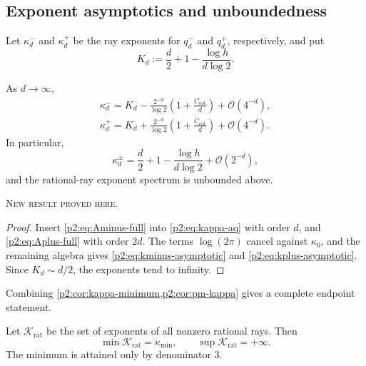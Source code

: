 \documentclass[11pt,oneside]{article}
\theoremstyle{definition}
\theoremstyle{remark}
\newcommand{\bigO}{\mathcal O}
\newcommand{\newresult}{\textcolor{newgreen}{\textsc{New result proved here.}}}
\begin{document}
\subsection{Exponent asymptotics and unboundedness}

Let $\kappa_d^-$ and $\kappa_d^+$ be the ray exponents for $q_d^-$ and $q_d^+$,
respectively, and put
\begin{equation}
 K_d:=\frac d2+1-\frac{\log h}{d\log2}.
 \label{p2:eq:Kd}
\end{equation}

\begin{corollary}\label{p2:cor:pm-kappa}
As $d\to\infty$,
\begin{align}
 \boxed{
 \kappa_d^-=K_d-\frac{2^{-d}}{\log2}
 \left(1+\frac{C_{\cot}}d\right)+\bigO(4^{-d}),}
 \label{p2:eq:kminus-asymptotic}\\
 \boxed{
 \kappa_d^+=K_d+\frac{2^{-d}}{\log2}
 \left(1+\frac{C_{\cot}}d\right)+\bigO(4^{-d}).}
 \label{p2:eq:kplus-asymptotic}
\end{align}
In particular,
\begin{equation}
 \kappa_d^{\pm}=\frac d2+1-\frac{\log h}{d\log2}+\bigO(2^{-d}),
 \label{p2:eq:kpm-main}
\end{equation}
and the rational-ray exponent spectrum is unbounded above.

\smallskip\noindent\newresult
\end{corollary}

\begin{proof}
Insert \eqref{p2:eq:Aminus-full} into \eqref{p2:eq:kappa-aq} with order $d$, and
\eqref{p2:eq:Aplus-full} with order $2d$. The terms $\log(2\pi)$ cancel against
$\kappa_0$, and the remaining algebra gives \eqref{p2:eq:kminus-asymptotic} and
\eqref{p2:eq:kplus-asymptotic}. Since $K_d\sim d/2$, the exponents tend to infinity.
\end{proof}

Combining \cref{p2:cor:kappa-minimum,p2:cor:pm-kappa} gives a complete endpoint statement.

\begin{corollary}\label{p2:cor:spectrum-endpoints}
Let $\mathcal K_{\mathrm{rat}}$ be the set of exponents of all nonzero rational
rays. Then
\begin{equation}
 \min\mathcal K_{\mathrm{rat}}=\kappa_{\min},
 \qquad
 \sup\mathcal K_{\mathrm{rat}}=+\infty.
 \label{p2:eq:spectrum-endpoints}
\end{equation}
The minimum is attained only by denominator $3$.
\end{corollary}
\end{document}
